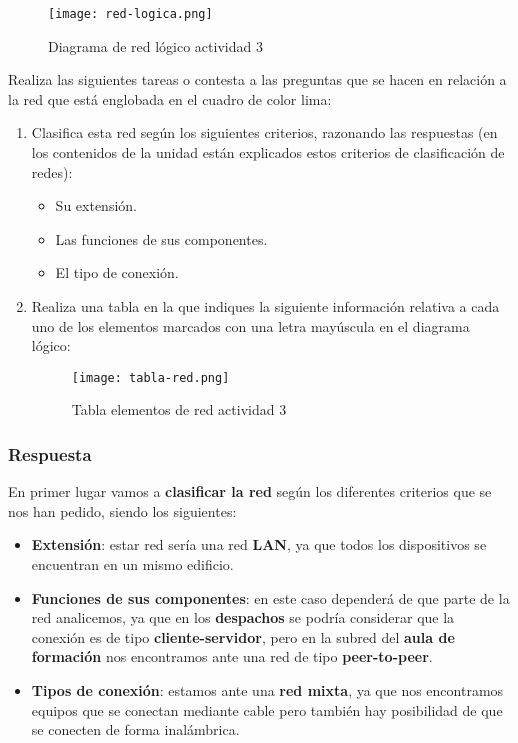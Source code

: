 \begin{figure}[H]
    \centering
    \texttt{[image: red-logica.png]}
    \caption{Diagrama de red lógico actividad 3}
\end{figure}

Realiza las siguientes tareas o contesta a las preguntas que se hacen en relación a la red que está englobada en el cuadro de color lima:

\begin{enumerate}
    \item Clasifica esta red según los siguientes criterios, razonando las respuestas (en los contenidos de la unidad están explicados estos criterios de clasificación de redes):
    \begin{itemize}
        \item Su extensión.
        \item Las funciones de sus componentes.
        \item El tipo de conexión.
    \end{itemize}

    \item Realiza una tabla en la que indiques la siguiente información relativa a cada uno de los elementos marcados con una letra mayúscula en el diagrama lógico:

    \begin{figure}[ht]
        \centering
        \texttt{[image: tabla-red.png]}
        \caption{Tabla elementos de red actividad 3}
    \end{figure}
\end{enumerate}

\subsubsection{Respuesta}

En primer lugar vamos a \textbf{clasificar la red} según los diferentes criterios que se nos han pedido, siendo los siguientes:

\begin{itemize}
    \item \textbf{Extensión}: estar red sería una red \textbf{LAN}, ya que todos los dispositivos se encuentran en un mismo edificio.

    \item \textbf{Funciones de sus componentes}: en este caso dependerá de que parte de la red analicemos, ya que en los \textbf{despachos} se podría considerar que la conexión es de tipo \textbf{cliente-servidor}, pero en la subred del \textbf{aula de formación} nos encontramos ante una red de tipo \textbf{peer-to-peer}.

   \item \textbf{Tipos de conexión}: estamos ante una \textbf{red mixta}, ya que nos encontramos equipos que se conectan mediante cable pero también hay posibilidad de que se conecten de forma inalámbrica.
\end{itemize}

